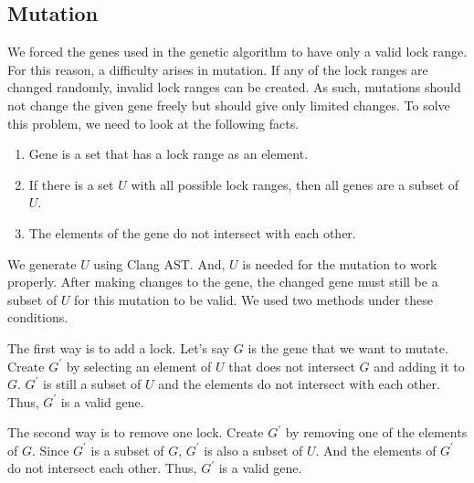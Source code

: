 \subsection{Mutation}
We forced the genes used in the genetic algorithm to have only a valid lock range. For this reason, a difficulty arises in mutation. If any of the lock ranges are changed randomly,  invalid lock ranges can be created. As such, mutations should not change the given gene freely but should give only limited changes. To solve this problem, we need to look at the following facts.

\begin{enumerate}
    \item Gene is a set that has a lock range as an element.
    \item If there is a set $U$ with all possible lock ranges, then all genes are a subset of $U$.
    \item The elements of the gene do not intersect with each other.
\end{enumerate}

We generate $U$ using Clang AST. And, $U$ is needed for the mutation to work properly. After making changes to the gene, the changed gene must still be a subset of $U$ for this mutation to be valid. We used two methods under these conditions.

The first way is to add a lock. Let's say $G$ is the gene that we want to mutate. Create $G^{'}$ by selecting an element of $U$ that does not intersect $G$ and adding it to $G$. $G^{'}$ is still a subset of $U$ and the elements do not intersect with each other. Thus, $G^{'}$ is a valid gene.

The second way is to remove one lock. Create $G^{'}$ by removing one of the elements of $G$. Since $G^{'}$ is a subset of $G$, $G^{'}$ is also a subset of $U$. And the elements of $G^{'}$ do not intersect each other. Thus, $G^{'}$ is a valid gene.
